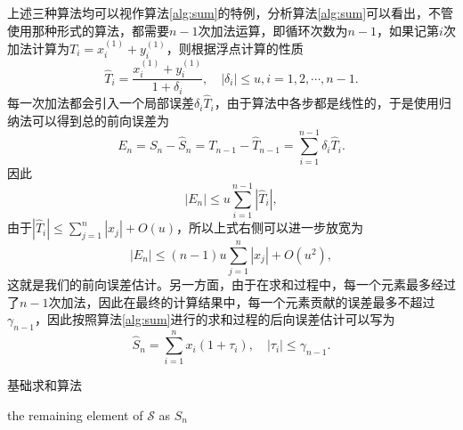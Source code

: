 \documentclass[a4paper,10pt]{ctexart}
\begin{document}

上述三种算法均可以视作算法\ref{alg:sum}的特例，分析算法\ref{alg:sum}可以看出，不管使用那种形式的算法，都需要$ n-1 $次加法运算，即循环次数为$ n-1 $，如果记第$ i $次加法计算为$ T_i = x_i^{(1)} + y_i^{(1)} $，则根据浮点计算的性质
\[
    \hat{T}_i = \frac{x_i^{(1)} + y_i^{(1)}}{1+\delta_i},\quad |\delta_i|\leqslant u, i=1,2,\cdots, n-1.
\]
每一次加法都会引入一个局部误差$ \delta_i \hat{T}_i $，由于算法中各步都是线性的，于是使用归纳法可以得到总的前向误差为
\[
    E_n = S_n - \hat{S}_n = T_{n-1} - \hat{T}_{n-1} = \sum_{i=1}^{n-1} \delta_i \hat{T}_i.
\]
因此
\[
    |E_n| \leqslant u \sum_{i=1}^{n-1} |\hat{T}_i|,
\]
由于$ |\hat{T}_i|\leqslant \sum_{j=1}^n |x_j|+O(u) $，所以上式右侧可以进一步放宽为
\begin{equation}\label{eq:forward_error_sum}
    |E_n| \leqslant (n-1)u \sum_{j=1}^n |x_j|+O(u^2),
\end{equation}
这就是我们的前向误差估计。另一方面，由于在求和过程中，每一个元素最多经过了$ n-1 $次加法，因此在最终的计算结果中，每一个元素贡献的误差最多不超过$ \gamma_{n-1} $，因此按照算法\ref{alg:sum}进行的求和过程的后向误差估计可以写为
\begin{equation}\label{eq:backward_error_sum}
    \hat{S}_n = \sum_{i=1}^n x_i(1+\tau_i),\quad |\tau_i|\leqslant \gamma_{n-1}.
\end{equation}

\begin{algorithm}[htbp]
    \caption{基础求和算法}\label{alg:sum}
    \Return the remaining element of $ \mathcal{S} $ as $ S_n $\;
\end{algorithm}
\end{document}
